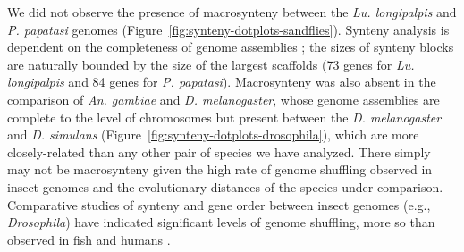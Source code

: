 We did not observe the presence of macrosynteny between the \emph{Lu. longipalpis} and \emph{P. papatasi} genomes (Figure~\ref{fig:synteny-dotplots-sandflies}).  Synteny analysis is dependent on the completeness of genome assemblies \cite{Heger2007}; the sizes of synteny blocks are naturally bounded by the size of the largest scaffolds (73 genes for \emph{Lu. longipalpis} and 84 genes for \emph{P. papatasi}). Macrosynteny was also absent in the comparison of \emph{An. gambiae} and \emph{D. melanogaster}, whose genome assemblies are complete to the level of chromosomes but present between the \emph{D. melanogaster} and \emph{D. simulans} (Figure~\ref{fig:synteny-dotplots-drosophila}), which are more closely-related than any other pair of species we have analyzed. There simply may not be macrosynteny given the high rate of genome shuffling observed in insect genomes and the evolutionary distances of the species under comparison. Comparative studies of synteny and gene order between insect genomes (e.g., \emph{Drosophila}) have indicated significant levels of genome shuffling, more so than observed in fish and humans \cite{Ranz2001,Zdobnov2002,Zdobnov2007}.

